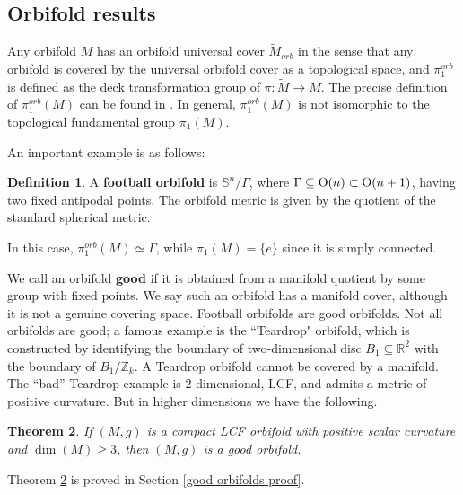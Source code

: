 \documentclass[12pt]{amsart}
\newtheorem{theorem}{Theorem}[section]
\theoremstyle{definition}
\newtheorem{definition}[theorem]{Definition}
\begin{document}
\subsection{Orbifold results}

Any orbifold $M$ has an orbifold universal cover $\tilde{M}_{orb}$ in the sense that any orbifold is covered by the universal orbifold cover as a topological space, and $\pi_1^{orb}$ is defined as the deck transformation group of $\pi: \tilde{M} \rightarrow M$. The precise definition of $\pi_1^{orb}(M)$ can be found in \cite{orbifold}. In general, $\pi_1^{orb}(M)$ is not isomorphic to the topological fundamental group $\pi_1(M)$.

An important example is as follows:
\begin{definition}\label{Def football}
    A \textbf{football orbifold} is  $\mathbb{S}^n/\Gamma$, where $\Gamma \subseteq {\rm{O}}(n) \subset {\rm{O}}(n+1)$, having two fixed antipodal points. The orbifold metric is given by the quotient of the standard spherical metric. 
\end{definition}
In this case, $\pi_1^{orb}(M) \simeq \Gamma$, while $\pi_1(M) = \{e\}$ since it is simply connected.

We call an orbifold \textbf{good} if it is obtained from a manifold quotient by some group with fixed points. We say such an orbifold has a manifold cover, although it is not a genuine covering space. Football orbifolds are good orbifolds. Not all orbifolds are good; a famous example is the ``Teardrop" orbifold, which is constructed by identifying the boundary of two-dimensional disc $B_1\subseteq\mathbb{R}^2$ with the boundary of $B_1/\mathbb{Z}_k$. A Teardrop orbifold cannot be covered by a manifold. %
The ``bad'' Teardrop example is $2$-dimensional, LCF, and admits a metric of positive curvature. But in higher dimensions we have the following.
\begin{theorem}\label{good orbifold}  If $(M,g)$ is a compact LCF orbifold with positive scalar curvature and $\dim(M) \geq 3$, then $(M,g)$ is a good orbifold.
\end{theorem}
Theorem \ref{good orbifold} is proved in Section \ref{good orbifolds proof}.
\end{document}
